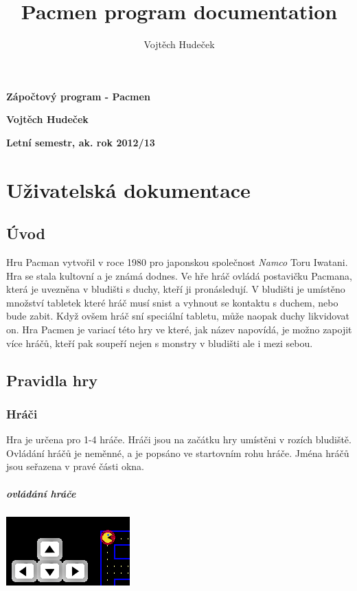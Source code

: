 \documentclass[10pt,a4paper]{article}
\author{Vojtěch Hudeček}
\title{Pacmen program documentation}
\begin{document}
\begin{center}

\begin{LARGE}
\textbf{Zápočtový program - Pacmen }

\textbf{Vojtěch Hudeček}

\textbf{Letní semestr, ak. rok 2012/13}
\linebreak 
\chapter{Uživatelská dokumentace}
\end{LARGE}
\end{center}
\section{Úvod}
Hru Pacman vytvořil v roce 1980 pro japonskou společnost \textit{Namco} Toru Iwatani. Hra se stala kultovní a je známá dodnes.
Ve hře hráč ovládá postavičku Pacmana, která je uvezněna v bludišti s duchy, kteří ji pronásledují.
V bludišti je umístěno množství tabletek které hráč musí snist a vyhnout se kontaktu s duchem, nebo bude zabit. Když ovšem hráč sní speciální tabletu, může naopak duchy likvidovat on.
Hra Pacmen je variací této hry ve které, jak název napovídá, je možno zapojit více hráčů, kteří pak soupeří nejen s monstry v bludišti ale i mezi sebou.
\section{Pravidla hry}
\subsection{Hráči}
Hra je určena pro 1-4 hráče. Hráči jsou na začátku hry umístěni v rozích bludiště. Ovládání hráčů je neměnné, a je popsáno ve startovním rohu hráče. Jména hráčů jsou seřazena v pravé části okna.
\paragraph{ovládání hráče}
\begin{center}
\includegraphics[scale=0.7]{images/arrows.png}
\end{center}
\end{document}
